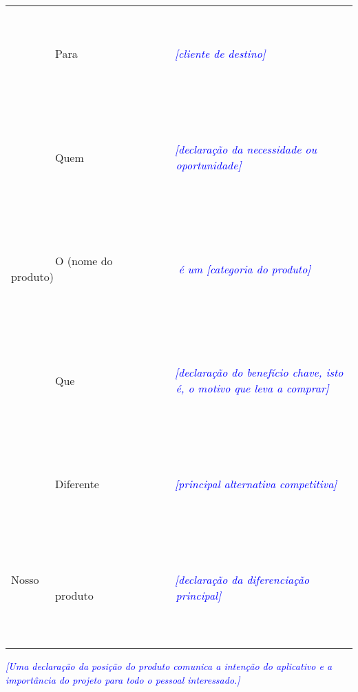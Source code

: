 \documentclass[a4paper]{article}
\begin{document}
\begin{flushleft}
\tablefirsthead{}
\tablehead{}
\tabletail{}
\tablelasttail{}
\begin{supertabular}{m{1.9768598in}|m{3.8511598in}|}
\hhline{~-}
~

\ \ \ \ \ \ \ \ Para

~
 &
~

\ \ \ \ \ \ \ \ \textit{\textcolor{blue}{[cliente de destino]}}

~
\\\hhline{~-}
~

\ \ \ \ \ \ \ \ Quem

~
 &
~

\ \ \ \ \ \ \ \ \textit{\textcolor{blue}{[declara\c{c}\~ao da necessidade ou \ \ \ \ \ \ \ \ oportunidade]}}

~
\\\hhline{~-}
~

\ \ \ \ \ \ \ \ O (nome do produto)

~
 &
~

\ \ \ \ \ \ \ \ \textcolor{blue}{ }\textit{\textcolor{blue}{\'e um [categoria do produto]}}

~
\\\hhline{~-}
~

\ \ \ \ \ \ \ \ Que

~
 &
~

\ \ \ \ \ \ \ \ \textit{\textcolor{blue}{[declara\c{c}\~ao do benef\'icio chave, isto \ \ \ \ \ \ \ \ \'e, o motivo que
leva a comprar]}}

~
\\\hhline{~-}
~

\ \ \ \ \ \ \ \ Diferente

~
 &
~

\ \ \ \ \ \ \ \ \textit{\textcolor{blue}{[principal alternativa competitiva]}}

~
\\\hhline{~-}
~

Nosso \ \ \ \ \ \ \ \ produto

~
 &
~

\ \ \ \ \ \ \ \ \textit{\textcolor{blue}{[declara\c{c}\~ao da diferencia\c{c}\~ao \ \ \ \ \ \ \ \ principal]}}

~
\\\hhline{~-}
\end{supertabular}
\end{flushleft}
\textit{\textcolor{blue}{[Uma declara\c{c}\~ao da posi\c{c}\~ao do produto comunica a inten\c{c}\~ao do aplicativo e a
import\^ancia do projeto para todo o pessoal interessado.]}}
\end{document}
